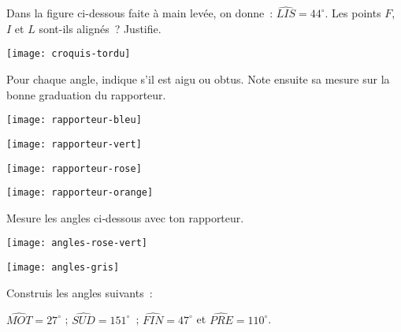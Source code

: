 \begin{exercice}[Alignés ?]
Dans la figure ci-dessous faite à main levée, on donne : $\widehat{LIS}= 44^\circ$.
Les points $F$, $I$ et $L$ sont-ils alignés ? Justifie.
 \begin{center} \texttt{[image: croquis-tordu]} \end{center}
\end{exercice} 



\begin{exercice}
Pour chaque angle, indique s'il est aigu ou obtus. Note ensuite sa mesure sur la bonne graduation du rapporteur.
\begin{colenumerate}{2}
 \item  
 
 \texttt{[image: rapporteur-bleu]}
 \item 
 
 \texttt{[image: rapporteur-vert]}
 \item 

 \texttt{[image: rapporteur-rose]}
 \item 
 
 \texttt{[image: rapporteur-orange]}
 
 \end{colenumerate}
\end{exercice} 

\begin{exercice}
Mesure les angles ci‑dessous avec ton rapporteur.
 \begin{center} \texttt{[image: angles-rose-vert]} \end{center}
 
 \begin{center} \texttt{[image: angles-gris]} \end{center}
\end{exercice} 




\newpage





\begin{exercice}
Construis les angles suivants :

$\widehat{MOT} = 27^\circ$ ; $\widehat{SUD} = 151^\circ$ ; $\widehat{FIN} = 47^\circ$ et $\widehat{PRE} = 110^\circ$.
\end{exercice} 


